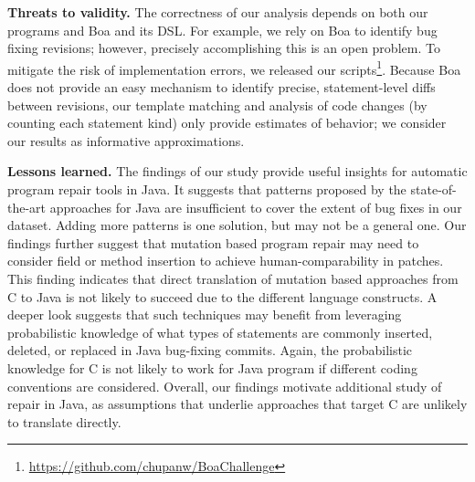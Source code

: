 \documentclass{sig-alternate-05-2015}
\begin{document}
\noindent\textbf{Threats to validity.} The correctness of our analysis
depends on both our programs and Boa and its DSL. For example, we rely on Boa to
identify bug fixing revisions; however, precisely accomplishing this is an open
problem.  To mitigate the risk of implementation errors,
we released our scripts\footnote{\url{https://github.com/chupanw/BoaChallenge}}.
Because Boa does not provide an easy mechanism
to identify precise, statement-level diffs between revisions, our template
matching and analysis of code changes (by counting each statement kind) only
provide estimates of behavior; we consider our results as informative
approximations. 

\noindent\textbf{Lessons learned.} The findings of our study provide useful
insights for automatic program repair tools in Java. It suggests that patterns
proposed by the state-of-the-art approaches for Java are insufficient to cover
the extent of bug fixes in our dataset.  Adding more patterns is one solution,
but may not be a general one.  Our findings further suggest that mutation based
program repair may need to consider field or method insertion to achieve
human-comparability in patches. This finding indicates that direct translation
of mutation based approaches from C to Java is not likely to succeed due to the
different language constructs.  A deeper look suggests that such techniques may
benefit from leveraging probabilistic knowledge of what types of statements are
commonly inserted, deleted, or replaced in Java bug-fixing commits. Again, the
probabilistic knowledge for C is not likely to work for Java program if
different coding conventions are considered.  Overall, our findings motivate
additional study of repair in Java, as assumptions that underlie approaches that
target C are unlikely to translate directly.



\end{document}
